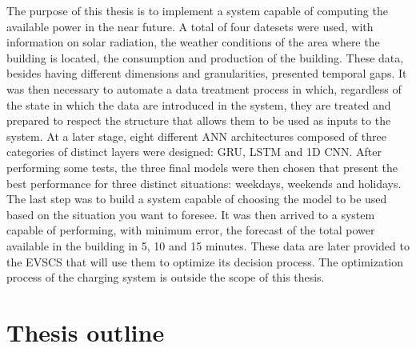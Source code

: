 The purpose of this thesis is to implement a system capable of computing the available power in the near future. A total of four datesets were used, with information on solar radiation, the weather conditions of the area where the building is located, the consumption and production of the building. These data, besides having different dimensions and granularities, presented temporal gaps. It was then necessary to automate a data treatment process in which, regardless of the state in which the data are introduced in the system, they are treated and prepared to respect the structure that allows them to be used as inputs to the system. At a later stage, eight different \ac{ANN} architectures composed of three categories of distinct layers were designed: \ac{GRU}, \ac{LSTM} and \ac{1D CNN}. After performing some tests, the three final models were then chosen that present the best performance for three distinct situations: weekdays, weekends and holidays. The last step was to build a system capable of choosing the model to be used based on the situation you want to foresee. It was then arrived to a system capable of performing, with minimum error, the forecast of the total power available in the building in 5, 10 and 15 minutes. These data are later provided to the \ac{EVSCS} that will use them to optimize its decision process. The optimization process of the charging system is outside the scope of this thesis.





\section{Thesis outline}